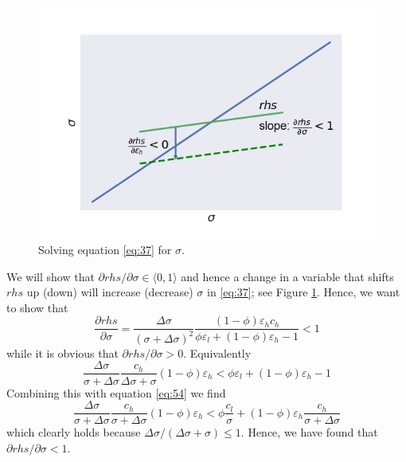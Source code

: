\documentclass[12pt,english,a4paper]{article}
\begin{document}
\begin{figure}[htbp]
\centering
\includegraphics[width=.9\linewidth]{./fixedpoint.png}
\caption{\label{fig:org3a39a08}Solving equation \eqref{eq:37} for \(\sigma\).}
\end{figure}

We will show that \(\partial rhs/\partial \sigma \in \langle 0,1 \rangle\) and hence a change in a variable that shifts \(rhs\) up (down) will increase (decrease) \(\sigma\) in \eqref{eq:37}; see Figure \ref{fig:org3a39a08}. Hence, we want to show that
\begin{equation}
\label{eq:25}
\frac{\partial rhs}{\partial \sigma} = \frac{\Delta \sigma}{(\sigma+\Delta \sigma)^2} \frac{(1-\phi) \varepsilon_h c_h}{\phi \varepsilon_l + (1-\phi) \varepsilon_h -1} < 1
\end{equation}
while it is obvious that \(\partial rhs/\partial \sigma >0\). Equivalently
\begin{equation}
\label{eq:27}
\frac{\Delta \sigma}{\sigma + \Delta \sigma} \frac{c_h}{\Delta \sigma + \sigma}(1-\phi)\varepsilon_h < \phi \varepsilon_l + (1-\phi) \varepsilon_h -1
\end{equation}
Combining this with equation \eqref{eq:54} we find
\begin{equation}
\label{eq:30}
\frac{\Delta \sigma}{\sigma+\Delta \sigma}\frac{c_h}{\sigma+\Delta\sigma}(1-\phi)\varepsilon_h < \phi \frac{c_l}{\sigma}+(1-\phi)\varepsilon_h \frac{c_h}{\sigma+\Delta\sigma}
\end{equation}
which clearly holds because \(\Delta\sigma/(\Delta\sigma+\sigma) \leq 1\). Hence, we have found that \(\partial rhs/\partial \sigma < 1\).
\end{document}
